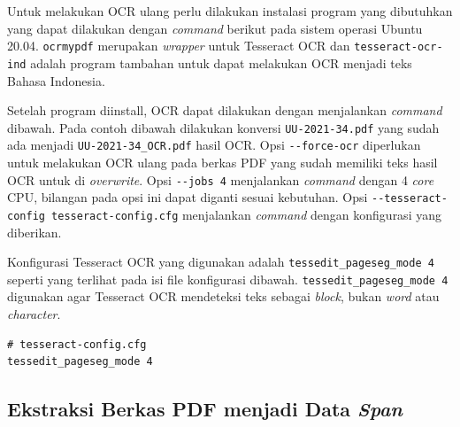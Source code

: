 Untuk melakukan OCR ulang perlu dilakukan instalasi program yang
dibutuhkan yang dapat dilakukan dengan \emph{command} berikut pada
sistem operasi Ubuntu 20.04. \texttt{ocrmypdf} merupakan \emph{wrapper}
untuk Tesseract OCR dan \texttt{tesseract-ocr-ind} adalah program
tambahan untuk dapat melakukan OCR menjadi teks Bahasa Indonesia.

\begin{Shaded}
\begin{Highlighting}[]
 
 
\end{Highlighting}
\end{Shaded}

Setelah program diinstall, OCR dapat dilakukan dengan menjalankan
\emph{command} dibawah. Pada contoh dibawah dilakukan konversi
\texttt{UU-2021-34.pdf} yang sudah ada menjadi
\texttt{UU-2021-34\_OCR.pdf} hasil OCR. Opsi \texttt{-{}-force-ocr}
diperlukan untuk melakukan OCR ulang pada berkas PDF yang sudah memiliki
teks hasil OCR untuk di \emph{overwrite}. Opsi \texttt{-{}-jobs 4}
menjalankan \emph{command} dengan 4 \emph{core} CPU, bilangan pada opsi
ini dapat diganti sesuai kebutuhan. Opsi
\texttt{-{}-tesseract-config tesseract-config.cfg} menjalankan
\emph{command} dengan konfigurasi yang diberikan.

\begin{Shaded}
\begin{Highlighting}[]
 
\end{Highlighting}
\end{Shaded}

Konfigurasi Tesseract OCR yang digunakan adalah
\texttt{tessedit\_pageseg\_mode 4} seperti yang terlihat pada isi file
konfigurasi dibawah. \texttt{tessedit\_pageseg\_mode 4} digunakan agar
Tesseract OCR mendeteksi teks sebagai \emph{block}, bukan \emph{word}
atau \emph{character}.

\begin{verbatim}
# tesseract-config.cfg
tessedit_pageseg_mode 4
\end{verbatim}

\subsection{Ekstraksi Berkas PDF menjadi Data
\emph{Span}}\label{ekstraksi-berkas-pdf-menjadi-data-span}

